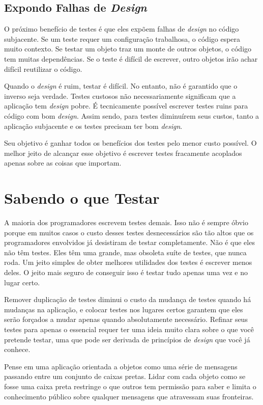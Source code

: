 \subsection{Expondo Falhas de \textit{Design}}

O próximo benefício de testes é que eles expõem falhas de \textit{design} no código subjacente. Se um teste requer um configuração trabalhosa, o código espera muito contexto. Se testar um objeto traz um monte de outros objetos, o código tem muitas dependências. Se o teste é difícil de escrever, outro objetos irão achar difícil reutilizar o código. 

Quando o \textit{design} é ruim, testar é difícil. No entanto, não é garantido que o inverso seja verdade. Testes custosos não necessariamente significam que a aplicação tem \textit{design} pobre. É tecnicamente possível escrever testes ruins para código com bom \textit{design}. Assim sendo, para testes diminuírem seus custos, tanto a aplicação subjacente e os testes precisam ter bom \textit{design}.

Seu objetivo é ganhar todos os benefícios dos testes pelo menor custo possível. O melhor jeito de alcançar esse objetivo é escrever testes fracamente acoplados apenas sobre as coisas que importam.

\section{Sabendo o que Testar}

A maioria dos programadores escrevem testes demais. Isso não é sempre óbvio porque em muitos casos o custo desses testes desnecessários são tão altos que os programadores envolvidos já desistiram de testar completamente. Não é que eles não têm testes. Eles têm uma grande, mas obsoleta suíte de testes, que nunca roda. Um jeito simples de obter melhores utilidades dos testes é escrever menos deles. O jeito mais seguro de conseguir isso é testar tudo apenas uma vez e no lugar certo. 

Remover duplicação de testes diminui o custo da mudança de testes quando há mudanças na aplicação, e colocar testes nos lugares certos garantem que eles serão forçados a mudar apenas quando absolutamente necessário. Refinar seus testes para apenas o essencial requer ter uma ideia muito clara sobre o que você pretende testar, uma que pode ser derivada de princípios de \textit{design} que você já conhece.

Pense em uma aplicação orientada a objetos como uma série de mensagens passando entre um conjunto de caixas pretas. Lidar com cada objeto como se fosse uma caixa preta restringe o que outros tem permissão para saber e limita o conhecimento público sobre qualquer mensagens que atravessam suas fronteiras.

